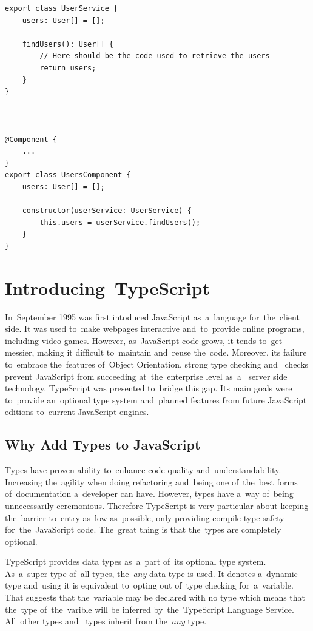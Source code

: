 \pagebreak
\begin{lstlisting}[caption=An example of simple dependency injection in
Angular., label=AngularService,language=HTML]
export class UserService {
	users: User[] = [];
	
	findUsers(): User[] {
		// Here should be the code used to retrieve the users
		return users;
	}
}

	

@Component {
	...
}
export class UsersComponent {
	users: User[] = [];
	
	constructor(userService: UserService) {
		this.users = userService.findUsers();
	}
}
\end{lstlisting}

\section{Introducing~TypeScript}
\label{TypeScript}
In~September 1995 was first intoduced JavaScript as~a~language for~the~client
side. It was used to~make webpages interactive and~to~provide online programs,
including video games. However, as~JavaScript code grows, it tends to~get
messier, making it difficult to~maintain and~reuse the~code. Moreover, its
failure to~embrace the~features of~Object Orientation, strong type checking
and~ checks prevent JavaScript from succeeding
at~the~enterprise level as~a~ server side technology.
TypeScript was presented to~bridge this gap. Its main goals were to~provide
an~optional type system and~planned features from future JavaScript editions
to~current JavaScript engines.

\subsection{Why Add Types to JavaScript}
Types have proven ability to~enhance code quality and~understandability.
Increasing the~agility when doing refactoring and~being one of~the~best forms
of~documentation a~developer can have. However, types have a~way of~being
unnecessarily ceremonious. Therefore TypeScript is very particular about keeping
the~barrier to~entry as~low as~possible, only providing compile type safety
for~the~JavaScript code. The~great thing is that the~types are completely
optional. 

TypeScript provides data types as~a~part of~its optional type system. As~a~super
type of~all types, the~\textit{any} data type is used. It denotes a~dynamic type
and~using it is equivalent to~opting out of~type checking for~a~variable. That
suggests that the~variable may be declared with no type which means that
the~type of~the~varible will be inferred by~the~TypeScript Language Service.
All~other  types and~ types inherit from
the~\textit{any} type.

